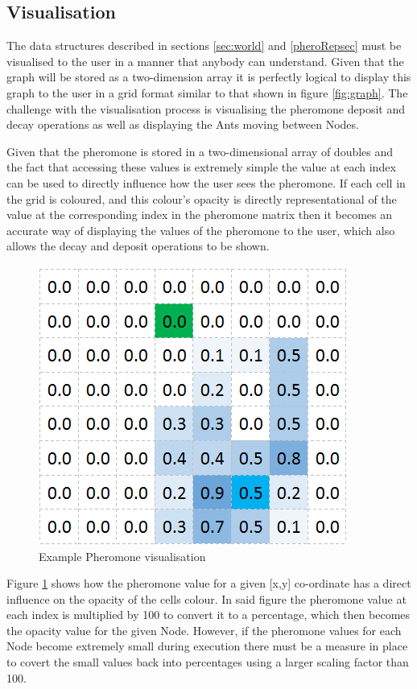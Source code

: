 \subsection{Visualisation}

The data structures described in sections \ref{sec:world} and \ref{pheroRepsec} must be visualised to the user in a manner that anybody can understand. Given that the graph will be stored as a two-dimension array it is perfectly logical to display this graph to the user in a grid format similar to that shown in figure \ref{fig:graph}. The challenge with the visualisation process is visualising the pheromone deposit and decay operations as well as displaying the Ants moving between Nodes.

Given that the pheromone is stored in a two-dimensional array of doubles and the fact that accessing these values is extremely simple the value at each index can be used to directly influence how the user sees the pheromone. If each cell in the grid is coloured, and this colour's opacity is directly representational of the value at the corresponding index in the pheromone matrix then it becomes an accurate way of displaying the values of the pheromone to the user, which also allows the decay and deposit operations to be shown.

\begin{figure}[H]
\centering
\includegraphics[scale=0.8]{Images/pheroEX}
\caption{Example Pheromone visualisation}
\label{fig:pheroVis}
\end{figure}

\noindent
Figure \ref{fig:pheroVis} shows how the pheromone value for a given [x,y] co-ordinate has a direct influence on the opacity of the cells colour. In said figure the pheromone value at each index is multiplied by 100 to convert it to a percentage, which then becomes the opacity value for the given Node. However, if the pheromone values for each Node become extremely small during execution there must be a measure in place to covert the small values back into percentages using a larger scaling factor than 100.


\clearpage